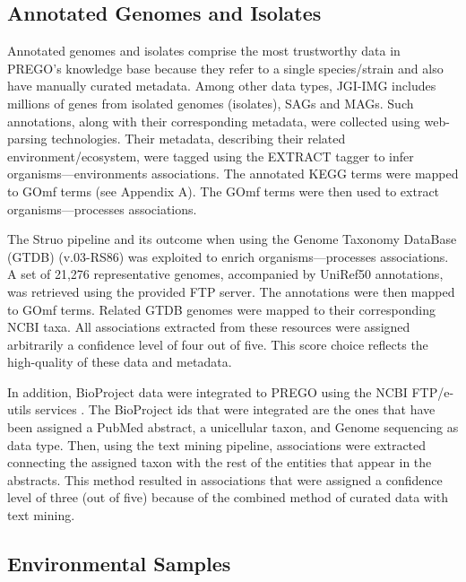    \subsection{Annotated Genomes and Isolates}
   \label{subsec:prego-isolates}

   Annotated genomes and isolates comprise the most trustworthy data in PREGO's knowledge base because they refer to a single species/strain and also have manually curated metadata. 
   Among other data types, JGI-IMG \parencite{chen2021img, mukherjee2021genomes} includes millions of genes from isolated genomes (isolates), SAGs and MAGs. Such annotations, along with their corresponding metadata, were collected using web-parsing technologies. Their metadata, describing their related environment/ecosystem, were tagged using the EXTRACT tagger to infer organisms—environments associations. The annotated KEGG terms were mapped to GOmf terms (see Appendix A). The GOmf terms were then used to extract organisms—processes associations.
   
   The Struo pipeline \parencite{de2020struo} and its outcome when using the Genome Taxonomy DataBase (GTDB) (v.03-RS86) \parencite{parks2020complete} was exploited to enrich organisms—processes associations. 
   A set of 21,276 representative genomes, accompanied by UniRef50 annotations, was retrieved using the provided FTP server. The annotations were then mapped to GOmf terms. 
   Related GTDB genomes were mapped to their corresponding NCBI taxa. 
   All associations extracted from these resources were assigned arbitrarily a confidence level of four out of five. 
   This score choice reflects the high-quality of these data and metadata.
   
   In addition, BioProject data were integrated to PREGO using the NCBI FTP/e-utils services \parencite{sayers2021database}. 
   The BioProject ids that were integrated are the ones that have been assigned a PubMed abstract, a unicellular taxon, and Genome sequencing as data type. Then, using the text mining pipeline, associations were extracted connecting the assigned taxon with the rest of the entities that appear in the abstracts. This method resulted in associations that were assigned a confidence level of three (out of five) because of the combined method of curated data with text mining.


   \subsection{Environmental Samples}
   \label{subsec:prego-envsamples}

